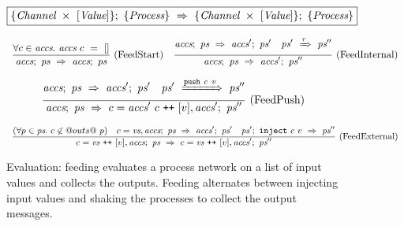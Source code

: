 
\begin{figure}

$$
  \boxed{
    \{\textit{Channel} ~\times~ [\textit{Value}]\};~\{ \textit{Process} \}~\Rightarrow~\{\textit{Channel} ~\times~ [\textit{Value}]\};~\{ \textit{Process} \}
  }
$$

\newcommand\vs {\ti{vs}}
\newcommand\accs {\ti{accs}}
\newcommand\network {\ti{ps}}

$$
\ruleIN{
  \forall c \in \accs.~
  \accs~c~=~[]
}{
  \ProcsFeed
    {\accs}
    {\network}
    {\accs}
    {\network}
}{FeedStart}
%
\ruleIN{
  \ProcsFeed
    {\accs}
    {\network}
    {\accs'}
    {\network'}
\quad
  \ProcsShake
    {\network'}
    {\tau}
    {\network''}
}{
  \ProcsFeed
    {\accs}
    {\network}
    {\accs'}
    {\network''}
}{FeedInternal}
$$

$$
\ruleIN{
  \ProcsFeed
    {\accs}
    {\network}
    {\accs'}
    {\network'}
\quad
  \ProcsShake
    {\network'}
    {\Push~c~v}
    {\network''}
}{
  \ProcsFeed
    {\accs}
    {\network}
    {c=\accs'~c \listappend [v], \accs'}
    {\network''}
}{FeedPush}
$$

$$
\ruleIN{
  (\forall p \in \network.~c \not\in @outs@~p)
\quad
  \ProcsFeed
    {c=\vs, \accs}
    {\network}
    {\accs'}
    {\network'}
\quad
  \ProcsInject
    {\network'}
    {c}{v}
    {\network''}
}{
  \ProcsFeed
    {c=\vs \listappend [v], \accs}
    {\network}
    {c=\vs \listappend [v], \accs'}
    {\network''}
}{FeedExternal}
$$


\caption{Evaluation: feeding evaluates a process network on a list of input values and collects the outputs.
Feeding alternates between injecting input values and shaking the processes to collect the output messages.}
\label{fig:Process:Eval:Feed}
\end{figure}

